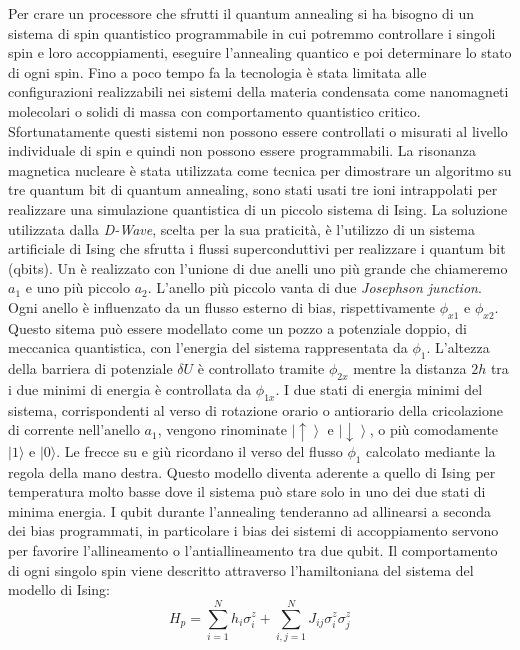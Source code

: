 Per crare un processore che sfrutti il quantum annealing si ha bisogno di un sistema di spin quantistico programmabile in cui potremmo controllare i singoli spin e loro accoppiamenti, eseguire l'annealing quantico e poi determinare lo stato di ogni spin.
Fino a poco tempo fa la tecnologia è stata limitata alle configurazioni realizzabili nei sistemi della materia condensata come nanomagneti molecolari o solidi di massa con comportamento quantistico critico. Sfortunatamente questi sistemi non possono essere controllati o misurati al livello individuale di spin e quindi non possono essere programmabili. La risonanza magnetica nucleare è stata utilizzata come tecnica per dimostrare un algoritmo su tre quantum bit di quantum annealing, sono stati usati tre ioni intrappolati per realizzare una simulazione quantistica di un piccolo sistema di Ising.
La soluzione utilizzata dalla \textit{D-Wave}, scelta per la sua praticità, è l'utilizzo di un sistema artificiale di Ising che sfrutta i flussi superconduttivi per realizzare i quantum bit (qbits). Un  è realizzato con l'unione di due anelli uno più grande che chiameremo $a_1$ e uno più piccolo $a_2$. L'anello più piccolo vanta di due \textit{Josephson junction}. Ogni anello è influenzato da un flusso esterno di bias, rispettivamente $\phi_{x1}$ e $\phi_{x2}$. Questo sitema può essere modellato come un pozzo a potenziale doppio, di meccanica quantistica, con l'energia del sistema rappresentata da $\phi_1$. L'altezza della barriera di potenziale $\delta U$ è controllato tramite $\phi_{2x}$ mentre la distanza $2h$ tra i due minimi di energia è controllata da $\phi_{1x}$.
I due stati di energia minimi del sistema, corrispondenti al verso di rotazione orario o antiorario della cricolazione di corrente nell'anello $a_1$, vengono rinominate $\left|\uparrow \right\rangle$ e $\left|\downarrow \right\rangle$, o più comodamente $|1 \rangle$ e $|0 \rangle$. Le frecce su e giù ricordano il verso del flusso $\phi_1$ calcolato mediante la regola della mano destra. Questo modello diventa aderente a quello di Ising per temperatura molto basse dove il sistema può stare solo in uno dei due stati di minima energia. I qubit durante l'annealing tenderanno ad allinearsi a seconda dei bias programmati, in particolare i bias dei sistemi di accoppiamento servono per favorire l'allineamento o l'antiallineamento tra due qubit. Il comportamento di ogni singolo spin viene descritto attraverso l'hamiltoniana del sistema del modello di Ising:
$$H_p = \sum_{i=1}^N h_i \sigma_i^z + \sum_{i,j=1}^N J_{ij} \sigma_i^z \sigma_j^z$$
